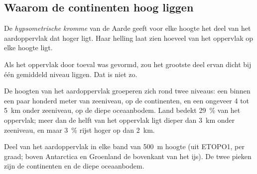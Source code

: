 \subsection{Waarom de continenten hoog liggen}

\begin{definition}\label{def:g11:lithosphere-asthenosphere:hypsometry}
De \emph{hypsometrische kromme} van de Aarde geeft
voor elke hoogte het deel van het aardoppervlak dat hoger ligt. Haar helling laat
zien hoeveel van het oppervlak op elke hoogte ligt.
\end{definition}

Als het oppervlak door toeval was gevormd, zou het grootste deel ervan dicht bij
één gemiddeld niveau liggen. Dat is niet zo.

\begin{proposition}\label{prop:g11:lithosphere-asthenosphere:two-levels}
De hoogten van het aardoppervlak groeperen zich rond twee niveaus: een binnen een
paar honderd meter van zeeniveau, op de continenten, en een ongeveer 4 tot
\qty{5}{km} onder zeeniveau, op de diepe oceaanbodem. Land bedekt \qty{29}{\percent}
van het oppervlak; meer dan de helft van het oppervlak ligt dieper dan \qty{3}{km}
onder zeeniveau, en maar \qty{3}{\percent} rijst hoger op dan \qty{2}{km}.
\end{proposition}

\begin{omfigure}

{\small Deel van het aardoppervlak in elke band van \qty{500}{m} hoogte (uit
ETOPO1, per graad; boven Antarctica en Groenland de bovenkant van het ijs). De
twee pieken zijn de continenten en de diepe oceaanbodem.}
\end{omfigure}

